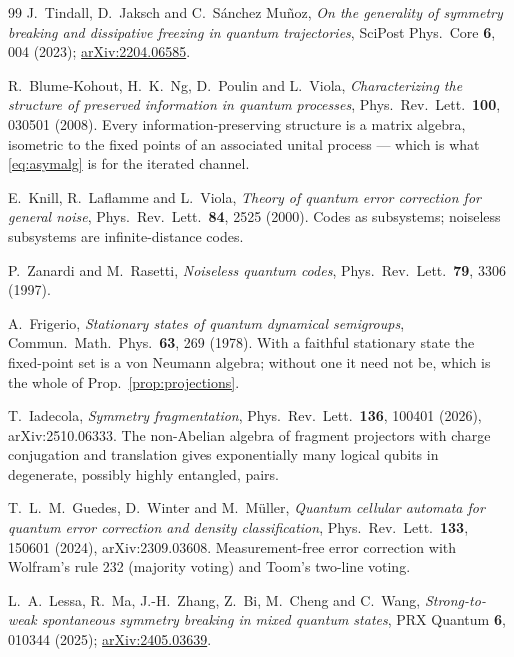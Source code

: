 \documentclass[11pt]{article}
\theoremstyle{plain}
\theoremstyle{definition}
\theoremstyle{remark}
\begin{document}
\begin{thebibliography}{99}
 J.~Tindall, D.~Jaksch and C.~S\'anchez Mu\~noz,
\emph{On the generality of symmetry breaking and dissipative freezing in
quantum trajectories},
SciPost Phys.\ Core \textbf{6}, 004 (2023);
\href{https://arxiv.org/abs/2204.06585}{arXiv:2204.06585}.

 R.~Blume-Kohout, H.~K.~Ng, D.~Poulin and L.~Viola,
  \emph{Characterizing the structure of preserved information in quantum
  processes},
  Phys.\ Rev.\ Lett.\ \textbf{100}, 030501 (2008).
  Every information-preserving structure is a matrix algebra, isometric to the
  fixed points of an associated unital process --- which is what
  \eqref{eq:asymalg} is for the iterated channel.

 E.~Knill, R.~Laflamme and L.~Viola,
  \emph{Theory of quantum error correction for general noise},
  Phys.\ Rev.\ Lett.\ \textbf{84}, 2525 (2000).
  Codes as subsystems; noiseless subsystems are infinite-distance codes.

 P.~Zanardi and M.~Rasetti,
  \emph{Noiseless quantum codes},
  Phys.\ Rev.\ Lett.\ \textbf{79}, 3306 (1997).

 A.~Frigerio,
  \emph{Stationary states of quantum dynamical semigroups},
  Commun.\ Math.\ Phys.\ \textbf{63}, 269 (1978).
  With a faithful stationary state the fixed-point set is a von Neumann
  algebra; without one it need not be, which is the whole of
  Prop.~\ref{prop:projections}.

 T.~Iadecola,
  \emph{Symmetry fragmentation},
  Phys.\ Rev.\ Lett.\ \textbf{136}, 100401 (2026), arXiv:2510.06333.
  The non-Abelian algebra of fragment projectors with charge conjugation and
  translation gives exponentially many logical qubits in degenerate,
  possibly highly entangled, pairs.

 T.~L.~M.~Guedes, D.~Winter and M.~M\"uller,
  \emph{Quantum cellular automata for quantum error correction and density
  classification},
  Phys.\ Rev.\ Lett.\ \textbf{133}, 150601 (2024), arXiv:2309.03608.
  Measurement-free error correction with Wolfram's rule 232 (majority voting)
  and Toom's two-line voting.

 L.~A.~Lessa, R.~Ma, J.-H.~Zhang, Z.~Bi, M.~Cheng and
C.~Wang,
\emph{Strong-to-weak spontaneous symmetry breaking in mixed quantum states},
PRX Quantum \textbf{6}, 010344 (2025);
\href{https://arxiv.org/abs/2405.03639}{arXiv:2405.03639}.

\end{thebibliography}
\end{document}
